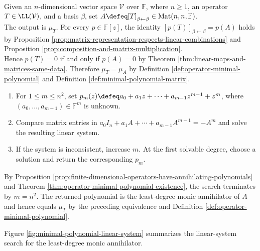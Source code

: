 \begin{computationmethod} \label{meth:operator-minimal-polynomial-from-matrix} \\
Given an $n$-dimensional vector space $\mathcal{V}$ over $\mathbb{F}$, where $n\geq1$, an operator $T\in\LL(\mathcal{V})$, and a basis $\beta$, set $A\defeq[T]_{\beta\leftarrow\beta}\in\operatorname{Mat}(n,n,\mathbb{F})$.\\
The output is $\mu_T$. For every $p\in\mathbb{F}[z]$, the identity $[p(T)]_{\beta\leftarrow\beta}=p(A)$ holds by Proposition \ref{prop:matrix-representation-respects-linear-combinations} and Proposition \ref{prop:composition-and-matrix-multiplication}.\\
Hence $p(T)=0$ if and only if $p(A)=0$ by Theorem \ref{thm:linear-maps-and-matrices-same-data}. Therefore $\mu_T=\mu_A$ by Definition \ref{def:operator-minimal-polynomial} and Definition \ref{def:minimal-polynomial-matrix}.
\begin{enumerate}[label=(\roman*)]
\setlength{\itemsep}{0pt}
\item For $1\leq m\leq n^2$, set $p_m(z)\defeq a_0+a_1z+\cdots+a_{m-1}z^{m-1}+z^m$, where $(a_0,\ldots,a_{m-1})\in\mathbb{F}^m$ is unknown.
\item Compare matrix entries in $a_0I_n+a_1A+\cdots+a_{m-1}A^{m-1}=-A^m$ and solve the resulting linear system.
\item If the system is inconsistent, increase $m$. At the first solvable degree, choose a solution and return the corresponding $p_m$.
\end{enumerate}
By Proposition \ref{prop:finite-dimensional-operators-have-annihilating-polynomials} and Theorem \ref{thm:operator-minimal-polynomial-existence}, the search terminates by $m=n^2$. The returned polynomial is the least-degree monic annihilator of $A$ and hence equals $\mu_T$ by the preceding equivalence and Definition \ref{def:operator-minimal-polynomial}.
\end{computationmethod}

Figure \ref{fig:minimal-polynomial-linear-system} summarizes the linear-system search for the least-degree monic annihilator.

\begin{illustrationfigure}[H]
  \centering
  
  \caption{Solve $a_0I_n+\cdots+a_{m-1}A^{m-1}=-A^m$; the first solvable monic candidate is $\mu_T$.}
  \label{fig:minimal-polynomial-linear-system}
\end{illustrationfigure}

